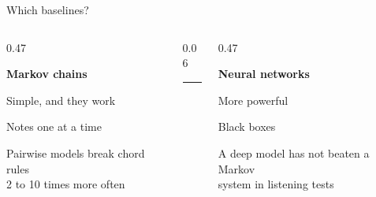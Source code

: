 
\begin{frame}{Which baselines?}
    \begin{columns}[T,onlytextwidth]
        \begin{column}{0.47\textwidth}
            \centering
            \parbox[t][3.0cm][t]{\linewidth}{\centering{}}\par
            {\Large\bfseries Markov chains}\par
            {\footnotesize\color{nord3}Simple, and they work \cite{hiller1959}\par}
            \medskip
            {\large Notes one at a time\par}
            {\color{nord3}Pairwise models break chord rules\\2 to 10 times more often \cite{hadjeres2016}}
        \end{column}
        \begin{column}{0.06\textwidth}
            \centering\textcolor{nord4}{\rule{0.6pt}{5.2cm}}
        \end{column}
        \begin{column}{0.47\textwidth}
            \centering
            \parbox[t][3.0cm][t]{\linewidth}{\centering{}}\par
            {\Large\bfseries Neural networks}\par
            {\footnotesize\color{nord3}More powerful \cite{hadjeres2017,liang2017,huang2017}\par}
            \medskip
            {\large Black boxes\par}
            {\color{nord3}A deep model has not beaten a Markov\\system in listening tests \cite{yin2023}}
        \end{column}
    \end{columns}
\end{frame}
